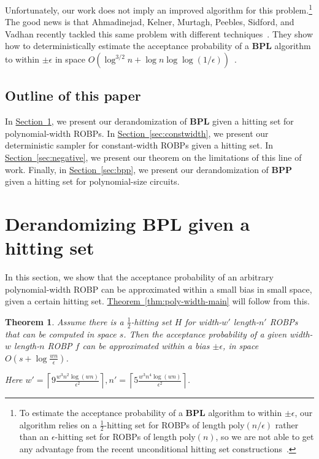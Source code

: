 \documentclass[11pt]{article}
\numberwithin{equation}{section}
\newtheorem{theorem}{Theorem}[section]
\theoremstyle{definition}
\theoremstyle{plain}
\newcommand{\expref}[2]{\hyperref[#2]{#1~\ref{#2}}}
\begin{document}
Unfortunately, our work does not imply an improved algorithm for this problem.\footnote{To estimate the acceptance probability of a $\mathbf{BPL}$ algorithm to within $\pm \epsilon$, our algorithm relies on a $\frac{1}{2}$-hitting set for ROBPs of length $\text{poly}(n/\epsilon)$ rather than an $\epsilon$-hitting set for ROBPs of length $\text{poly}(n)$, so we are not able to get any advantage from the recent unconditional hitting set constructions~\cite{BCG20,HZ20,CL20,CDRSTS21,PV21,Hoz21}.} The good news is that Ahmadinejad, Kelner, Murtagh, Peebles, Sidford, and Vadhan recently tackled this same problem with different techniques~\cite{AKMPSV20}. They show how to deterministically estimate the acceptance probability of a $\mathbf{BPL}$ algorithm to within $\pm \epsilon$ in space $O(\log^{3/2} n + \log n \log \log(1/\epsilon))$~\cite{AKMPSV20}.

\subsection{Outline of this paper}

In \expref{Section}{sec:polywidth}, we present our derandomization of $\mathbf{BPL}$ given a hitting set for polynomial-width ROBPs. In \expref{Section}{sec:constwidth}, we present our deterministic sampler for constant-width ROBPs given a hitting set. In \expref{Section}{sec:negative}, we present our theorem on the limitations of this line of work. Finally, in \expref{Section}{sec:bpp}, we present our derandomization of $\mathbf{BPP}$ given a hitting set for polynomial-size circuits.

\section{Derandomizing $\mathbf{BPL}$ given a hitting set}
\label{sec:polywidth}

In this section, we show that the acceptance probability of an arbitrary polynomial-width ROBP can be approximated within a small bias in small space, given a certain hitting set.
\expref{Theorem}{thm:poly-width-main} will follow from this.

\begin{theorem} \label{thm:HSGDerandROBP}
Assume there is a $\frac{1}{2}$-hitting set $H$  for width-$w'$ length-$n'$ ROBPs that can be computed in space $s$. Then the acceptance probability of a given width-$w$  length-$n$ ROBP $f$ can be approximated within a bias $\pm \epsilon$, in space $O(s+\log \frac{wn}{\epsilon})$.

Here $w'= \left \lceil 9 \frac{w^3 n^2  \log (wn) }{\epsilon^2} \right\rceil, n' = \left \lceil 5\frac{w^3n^4  \log (wn) }{\epsilon^2} \right \rceil$.
\end{theorem}
\end{document}
